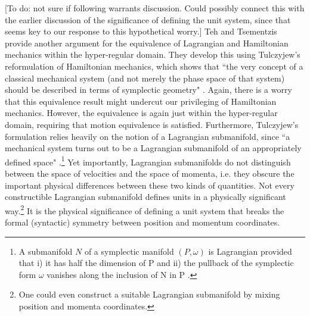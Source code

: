 \documentclass[letterpaper]{article}
\begin{document}
[To do: not sure if following warrants discussion. Could possibly connect this with the earlier discussion of the significance of defining the unit system, since that seems key to our response to this hypothetical worry.]
Teh and Tsementzis \parencites*[]{Teh} provide another argument for the equivalence of Lagrangian and Hamiltonian mechanics within the hyper-regular domain. They develop this using Tulczyjew's reformulation of Hamiltonian mechanics, which shows that ``the very concept of a classical mechanical system (and not merely the phase space of that system) should be described in terms of symplectic geometry" \parencites*[46]{Teh}. Again, there is a worry that this equivalence result might undercut our privileging of Hamiltonian mechanics. However, the equivalence is again just within the hyper-regular domain, requiring that motion equivalence is satisfied. Furthermore, Tulczyjew's formulation relies heavily on the notion of a Lagrangian submanifold, since ``a mechanical system turns out to be a Lagrangian submanifold of an appropriately defined space" \parencites[47]{Teh}.\footnote{A submanifold $N$ of a symplectic manifold $(P, \omega) $ is Lagrangian provided that i) it has half the dimension of P and ii) the pullback of the symplectic form $\omega$ vanishes along the inclusion of N in P \parencites[48]{Teh}.} Yet importantly, Lagrangian submanifolds do not distinguish between the space of velocities and the space of momenta, i.e. they obscure the important physical differences between these two kinds of quantities. Not every constructible Lagrangian submanifold defines units in a physically significant way.\footnote{One could even construct a suitable Lagrangian submanifold by mixing position and momenta coordinates.} It is the physical significance of defining a unit system that breaks the formal (syntactic) symmetry between position and momentum coordinates. 
\end{document}

